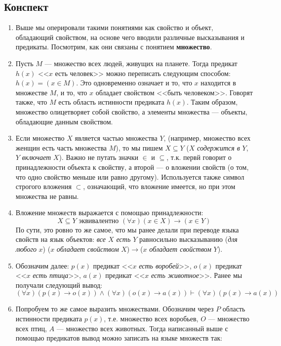 \subsection{Конспект}
\begin{enumerate}
\item Выше мы оперировали такими понятиями как свойство и объект, обладающий свойством, на основе чего вводили различные высказывания и предикаты. Посмотрим, как они связаны с понятием \textbf{множество}.
\item Пусть $M$ --- множество всех людей, живущих на планете. Тогда предикат $h(x)$ <<$x$ есть человек>> можно переписать следующим способом: $h(x)=(x\in M)$. Это одновременно означает и то, что $x$ находится в множестве $M$, и то, что $x$ обладает свойством <<быть человеком>>. Говорят также, что $M$ есть область истинности предиката $h(x)$. Таким образом, множество олицетворяет собой свойство, а элементы множества --- объекты, обладающие данным свойством.
\item Если множество $X$ является частью множества $Y$, (например, множество всех женщин есть часть множества $M$), то мы пишем $X\subseteq Y$ ($X$ \textit{содержится в} $Y$, $Y$ \textit{включает} $X$). Важно не путать значки $\in$ и $\subseteq$, т.к. первй говорит о принадлежности объекта к свойству, а второй --- о вложении свойств (о том, что одно свойство меньше или равно другому). Используется также символ строгого вложения $\subset$, означающий, что вложение имеется, но при этом множества не равны.
\item Вложение множеств выражается с помощью принадлежности:
$$
X\subseteq Y\mbox{ эквивалентно }(\forall x) (x\in X)\to(x\in Y)
$$
По сути, это ровно то же самое, что мы ранее делали при переводе языка свойств на язык объектов: \textit{все $X$ есть $Y$} равносильно высказыванию (\textit{для любого} $x$) ($x$ \textit{обладает свойством} $X$)$\to$($x$ \textit{обладает свойством} $Y$).
\item Обозначим далее: $p(x)$ предикат <<$x$ \textit{есть воробей}>>, $o(x)$ предикат <<$x$ \textit{есть птица}>>, $a(x)$ предикат <<$x$ \textit{есть животное}>>. Ранее мы получали следующий вывод:
$$
(\forall x) (p(x)\to o(x))\land (\forall x) (o(x)\to a(x))\vdash(\forall x) (p(x)\to a(x))
$$
\item Попробуем то же самое выразить множествами. Обозначим через $P$ область истинности предиката $p(x)$, т.е. множество всех воробьев, $O$ --- множество всех птиц, $A$ --- множество всех животных. Тогда написанный выше с помощью предикатов вывод можно записать на языке множеств так:

\end{enumerate}
